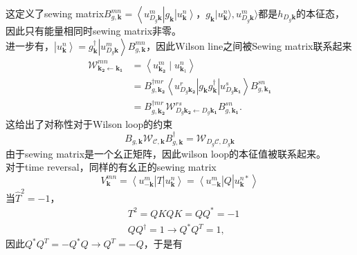 \documentclass[10pt,openany]{book}
\theoremstyle{thmstyle} %
\theoremstyle{defstyle} %
\theoremstyle{prostyle} %
\begin{document}
这定义了sewing matrix$ B_{g, \mathbf{k}}^{m n}=\left\langle u_{D_g \mathbf{k}}^m\right| g_{\mathbf{k}}\left|u_{\mathbf{k}}^n\right\rangle $，$ g_{\mathbf{k}}|u_{\mathbf{k}}^n\rangle,u_{D_g \mathbf{k}}^m\rangle $都是$ h_{D_g \mathbf{k}} $的本征态，因此只有能量相同时sewing matrix非零。\\
进一步有，$ \left|u_{\mathbf{k}}^n\right\rangle=g_{\mathbf{k}}^{\dagger}\left|u_{D_g \mathbf{k}}^m\right\rangle B_{g, \mathbf{k}}^{m n} $，因此Wilson line之间被Sewing matrix联系起来
\begin{equation}
  \begin{aligned}
\mathcal{W}_{\mathbf{k}_{\mathbf{2}} \leftarrow \mathbf{k}_{\mathbf{1}}}^{m n} & =\left\langle u_{\mathbf{k}_{\mathbf{2}}}^m \mid u_{\mathbf{k}_1}^n\right\rangle \\
& =B_{g, \mathbf{k}_{\mathbf{2}}}^{\dagger m r}\left\langle u_{D_g \mathbf{k}_{\mathbf{2}}}^r\right| g_{\mathbf{k}} g_{\mathbf{k}}^{\dagger}\left|u_{D_g \mathbf{k}_{\mathbf{1}}}^s\right\rangle B_{g, \mathbf{k}_{\mathbf{1}}}^{s n} \\
& =B_{g, \mathbf{k}_{\mathbf{2}}}^{\dagger m r} \mathcal{W}_{D_g \mathbf{k}_{\mathbf{2}} \leftarrow D_g \mathbf{k}_{\mathbf{1}}}^{r s} B_{g, \mathbf{k}_{\mathbf{1}}}^{s n} .
  \end{aligned}
\end{equation}
这给出了对称性对于Wilson loop的约束
\begin{equation}
  B_{g, \mathbf{k}} \mathcal{W}_{\mathcal{C}, \mathbf{k}} B_{g, \mathbf{k}}^{\dagger}=\mathcal{W}_{D_g \mathcal{C}, D_g \mathbf{k}}
\end{equation}
由于sewing matrix是一个幺正矩阵，因此wilson loop的本征值被联系起来。\\
对于time reversal，同样的有幺正的sewing matrix
\begin{equation}
  V_{\mathbf{k}}^{m n}=\left\langle u_{-\mathbf{k}}^m\right| T\left|u_{\mathbf{k}}^n\right\rangle=\left\langle u_{-\mathbf{k}}^m\right| Q\left|u_{\mathbf{k}}^{n *}\right\rangle
\end{equation}  
当$ \hat{T}^2=-1 $，
\begin{equation*}
  \begin{aligned}
    & T^2=Q K Q K=Q Q^*=-1 \\
    & Q Q^{\dagger}=1 \rightarrow Q^* Q^T=1,
    \end{aligned}
\end{equation*}
因此$ Q^* Q^T=-Q^* Q\to Q^T=-Q $，于是有
\end{document}
